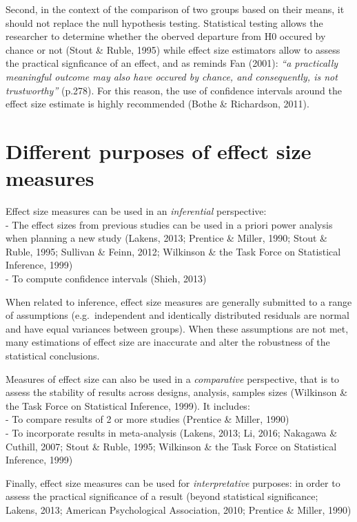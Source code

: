 \documentclass[man]{apa6}
\begin{document}
Second, in the context of the comparison of two groups based on their means, it should not replace the null hypothesis testing. Statistical testing allows the researcher to determine whether the oberved departure from H0 occured by chance or not (Stout \& Ruble, 1995) while effect size estimators allow to assess the practical signficance of an effect, and as reminds Fan (2001): \emph{\enquote{a practically meaningful outcome may also have occured by chance, and consequently, is not trustworthy}} (p.278). For this reason, the use of confidence intervals around the effect size estimate is highly recommended (Bothe \& Richardson, 2011).

\hypertarget{different-purposes-of-effect-size-measures}{%
\section{Different purposes of effect size measures}\label{different-purposes-of-effect-size-measures}}

Effect size measures can be used in an \emph{inferential} perspective:\\
- The effect sizes from previous studies can be used in a priori power analysis when planning a new study (Lakens, 2013; Prentice \& Miller, 1990; Stout \& Ruble, 1995; Sullivan \& Feinn, 2012; Wilkinson \& the Task Force on Statistical Inference, 1999)\\
- To compute confidence intervals (Shieh, 2013)

When related to inference, effect size measures are generally submitted to a range of assumptions (e.g.~independent and identically distributed residuals are normal and have equal variances between groups). When these assumptions are not met, many estimations of effect size are inaccurate and alter the robustness of the statistical conclusions.

Measures of effect size can also be used in a \emph{comparative} perspective, that is to assess the stability of results across designs, analysis, samples sizes (Wilkinson \& the Task Force on Statistical Inference, 1999). It includes:\\
- To compare results of 2 or more studies (Prentice \& Miller, 1990)\\
- To incorporate results in meta-analysis (Lakens, 2013; Li, 2016; Nakagawa \& Cuthill, 2007; Stout \& Ruble, 1995; Wilkinson \& the Task Force on Statistical Inference, 1999)

Finally, effect size measures can be used for \emph{interpretative} purposes: in order to assess the practical significance of a result (beyond statistical significance; Lakens, 2013; American Psychological Association, 2010; Prentice \& Miller, 1990)
\end{document}
